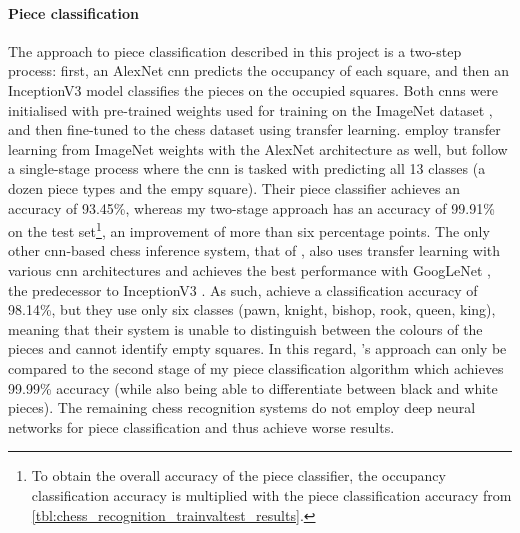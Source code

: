 \documentclass[../report.tex]{subfiles}
\begin{document}
\paragraph{Piece classification}
The approach to piece classification described in this project is a two-step process:
first, an AlexNet \cite{krizhevsky2017} \gls{cnn} predicts the occupancy of each square, and then an InceptionV3 \cite{szegedy2016} model classifies the pieces on the occupied squares. 
Both \glspl{cnn} were initialised with pre-trained weights used for training on the ImageNet dataset \cite{deng2009}, and then fine-tuned to the chess dataset using transfer learning.
\Textcite{mehta2020} employ transfer learning from ImageNet weights with the AlexNet architecture as well, but follow a single-stage process where the \gls{cnn} is tasked with predicting all 13 classes (a dozen piece types and the empy square).
Their piece classifier achieves an accuracy of 93.45\%, whereas my two-stage approach has an accuracy of 99.91\% on the test set\footnote{
    To obtain the overall accuracy of the piece classifier, the occupancy classification accuracy is multiplied with the piece classification accuracy from \cref{tbl:chess_recognition_trainvaltest_results}.
}, an improvement of more than six percentage points.
The only other \gls{cnn}-based chess inference system, that of \textcite{xie2018}, also uses transfer learning with various \gls{cnn} architectures and achieves the best performance with GoogLeNet \cite{szegedy2015}, the predecessor to InceptionV3 \cite{szegedy2016}.
As such, \citeauthor{xie2018} achieve a classification accuracy of 98.14\%, but they use only six classes (pawn, knight, bishop, rook, queen, king), meaning that their system is unable to distinguish between the colours of the pieces and cannot identify empty squares.
In this regard, \citeauthor{xie2018}'s approach can only be compared to the second stage of my piece classification algorithm which achieves 99.99\% accuracy (while also being able to differentiate between black and white pieces).
The remaining chess recognition systems do not employ deep neural networks for piece classification and thus achieve worse results.
\end{document}
